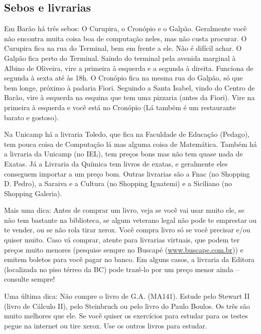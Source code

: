 \subsection{Sebos e livrarias}

Em Barão há três sebos: O Curupira, o Cronópio e o Galpão. Geralmente você não
encontra muita coisa boa de computação neles, mas não custa procurar. O Curupira
fica na rua do Terminal, bem em frente a ele. Não é difícil achar. O Galpão fica
perto do Terminal. Saindo do terminal pela avenida marginal à Albino de
Oliveira, vire a primeira à esquerda e a segunda à direita. Funciona de segunda
à sexta até às 18h. O Cronópio fica na mesma rua do Galpão, só que bem longe,
próximo à padaria Fiori. Seguindo a Santa Isabel, vindo do Centro de Barão, vire
à esquerda na esquina que tem uma pizzaria (antes da Fiori). Vire na primeira
à esquerda e você está no Cronópio (Lá também é um restaurante barato
e gostoso).

Na Unicamp há a livraria Toledo, que fica na Faculdade de Educação (Pedago), tem
pouca coisa de Computação lá mas alguma coisa de Matemática. Também há
a livraria da Unicamp (no IEL), tem preços bons mas não tem quase nada de
Exatas. Já a Livraria da Química tem livros de exatas, e geralmente eles
conseguem importar a um preço bom. Outras livrarias são a Fnac (no Shopping D.
Pedro), a Saraiva e a Cultura (no Shopping Iguatemi) e a Siciliano (no Shopping
Galeria).

Mais uma dica: Antes de comprar um livro, veja se você vai usar muito ele, se
não tem bastante na biblioteca, se algum veterano legal não pode te emprestar ou
te vender, ou se não rola tirar xerox. Você compra livro só se você precisar
e/ou quiser muito. Caso vá comprar, atente para livrarias virtuais, que podem
ter preços muito menores (pesquise sempre no Buscapé
(\url{www.buscape.com.br})) e emitem boletos para você pagar no banco.
Em alguns casos, a livraria da Editora (localizada no piso térreo da BC) pode
trazê-lo por um preço menor ainda -- consulte sempre!

Uma última dica: Não compre o livro de G.A. (MA141). Estude pelo Stewart II
(livro de Cálculo II), pelo Steinbruch ou pelo livro do Paulo
Boulos. Os três são muito melhores que ele. Se você quiser os exercícios para
estudar para os testes pegue na internet ou tire xerox. Use os outros livros
para estudar.

